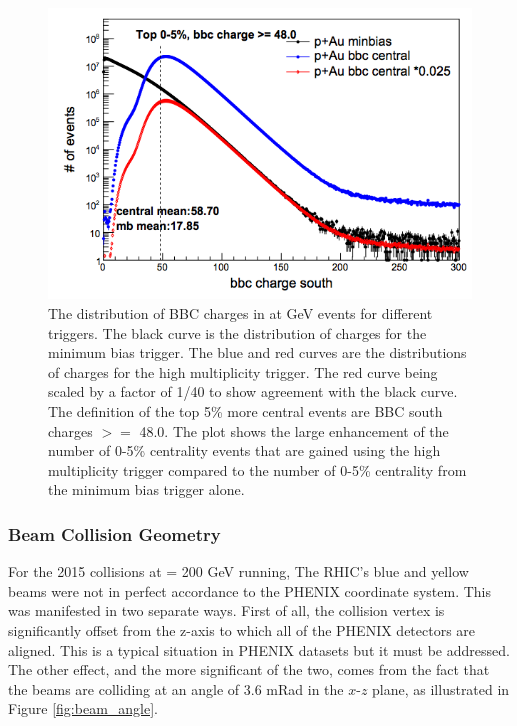 \begin{figure}[!ht]
\centering
\includegraphics[scale=0.55]{figs/pAu_centrality_trigger.png}
\caption{The distribution of BBC charges in \pau at  GeV events for different triggers. The black curve is the distribution of charges for the minimum bias trigger. The blue and red curves are the distributions of charges for the high multiplicity trigger. The red curve being scaled by a factor of 1/40 to show agreement with the black curve. The definition of the top 5\% more central events are BBC south charges $>=$ 48.0. The plot shows the large enhancement of the number of 0-5\% centrality events that are gained using the high multiplicity trigger compared to the number of 0-5\% centrality from the minimum bias trigger alone.}
\label{fig:pau_centrality_trig}
\end{figure}

\subsubsection{Beam Collision Geometry}
\label{sec:ch2_beam_col_geo}
For the 2015 \pau collisions at \sqsn = 200 GeV running, The RHIC's blue and yellow beams were not in perfect accordance to the PHENIX coordinate system. This was manifested in two separate ways. First of all, the collision vertex is significantly offset from the z-axis to which all of the PHENIX detectors are aligned. This is a typical situation in PHENIX datasets but it must be addressed. The other effect, and the more significant of the two, comes from the fact that the beams are colliding at an angle of 3.6 mRad in the $x$-$z$ plane, as illustrated in Figure \ref{fig:beam_angle}. 

